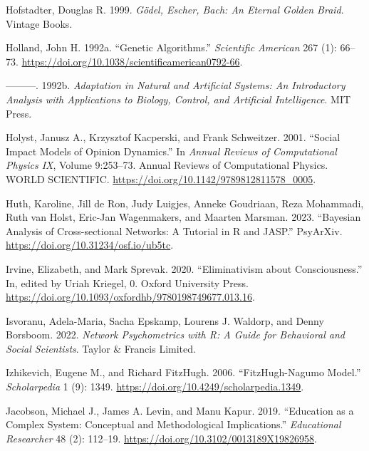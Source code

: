 \documentclass[
  letterpaper,
]{scrbook}
\newlength{\cslhangindent}
\newlength{\cslentryspacingunit} %
\newenvironment{CSLReferences}[2] %
 {%
  \setlength{\parindent}{0pt}
  \ifodd #1
  \let\oldpar\par
  \def\par{\hangindent=\cslhangindent\oldpar}
  \fi
  \setlength{\parskip}{#2\cslentryspacingunit}
 }%
 {}
\begin{document}
\begin{CSLReferences}{1}{0}
\leavevmode{}%
Hofstadter, Douglas R. 1999. \emph{Gödel, {Escher}, {Bach}: {An Eternal
Golden Braid}}. {Vintage Books}.

\leavevmode{}%
Holland, John H. 1992a. {``Genetic {Algorithms}.''} \emph{Scientific
American} 267 (1): 66--73.
\url{https://doi.org/10.1038/scientificamerican0792-66}.

\leavevmode{}%
---------. 1992b. \emph{Adaptation in {Natural} and {Artificial
Systems}: {An Introductory Analysis} with {Applications} to {Biology},
{Control}, and {Artificial Intelligence}}. {MIT Press}.

\leavevmode{}%
Holyst, Janusz A., Krzysztof Kacperski, and Frank Schweitzer. 2001.
{``Social Impact Models of Opinion Dynamics.''} In \emph{Annual
{Reviews} of {Computational Physics IX}}, Volume 9:253--73. Annual
{Reviews} of {Computational Physics}. {WORLD SCIENTIFIC}.
\url{https://doi.org/10.1142/9789812811578_0005}.

\leavevmode{}%
Huth, Karoline, Jill de Ron, Judy Luigjes, Anneke Goudriaan, Reza
Mohammadi, Ruth van Holst, Eric-Jan Wagenmakers, and Maarten Marsman.
2023. {``Bayesian {Analysis} of {Cross-sectional Networks}: {A Tutorial}
in {R} and {JASP}.''} {PsyArXiv}.
\url{https://doi.org/10.31234/osf.io/ub5tc}.

\leavevmode{}%
Irvine, Elizabeth, and Mark Sprevak. 2020. {``Eliminativism about
Consciousness.''} In, edited by Uriah Kriegel, 0. Oxford University
Press. \url{https://doi.org/10.1093/oxfordhb/9780198749677.013.16}.

\leavevmode{}%
Isvoranu, Adela-Maria, Sacha Epskamp, Lourens J. Waldorp, and Denny
Borsboom. 2022. \emph{Network {Psychometrics} with {R}: {A Guide} for
{Behavioral} and {Social Scientists}}. {Taylor \& Francis Limited}.

\leavevmode{}%
Izhikevich, Eugene M., and Richard FitzHugh. 2006. {``{FitzHugh-Nagumo}
Model.''} \emph{Scholarpedia} 1 (9): 1349.
\url{https://doi.org/10.4249/scholarpedia.1349}.

\leavevmode{}%
Jacobson, Michael J., James A. Levin, and Manu Kapur. 2019. {``Education
as a {Complex System}: {Conceptual} and {Methodological
Implications}.''} \emph{Educational Researcher} 48 (2): 112--19.
\url{https://doi.org/10.3102/0013189X19826958}.


\end{CSLReferences}
\end{document}
